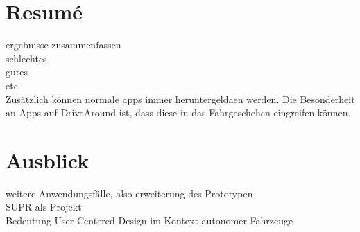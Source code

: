 \section{Resumé}
ergebnisse zusammenfassen\\
schlechtes\\
gutes\\
etc\\
Zusätzlich können normale apps immer heruntergeldaen werden. Die Besonderheit an Apps auf DriveAround ist, dass diese in das Fahrgeschehen eingreifen können.

\section{Ausblick}
weitere Anwendungsfälle, also erweiterung des Prototypen\\
SUPR als Projekt\\
Bedeutung User-Centered-Design im Kontext autonomer Fahrzeuge